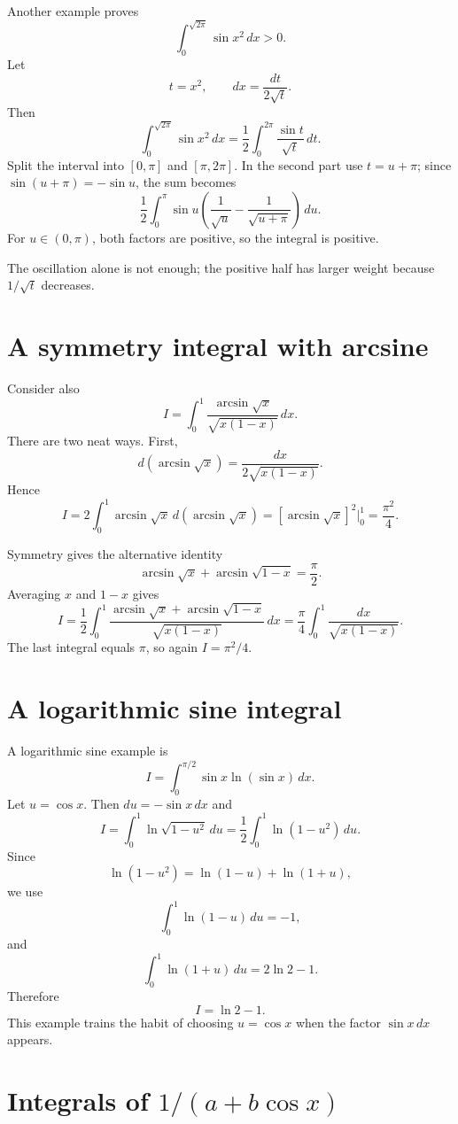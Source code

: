Another example proves
\[
  \int_0^{\sqrt{2\pi}}\sin x^2\,dx>0.
\]
Let
\[
  t=x^2,\qquad dx=
\frac{dt}{2\sqrt t}.
\]
Then
\[
  \int_0^{\sqrt{2\pi}}\sin x^2\,dx
  =
\frac12\int_0^{2\pi}
\frac{\sin t}{\sqrt t}\,dt.
\]
Split the interval into $[0,\pi]$ and $[\pi,2\pi]$.  In the second part use $t=u+\pi$; since $\sin(u+\pi)=-\sin u$, the sum becomes
\[
\frac12\int_0^\pi \sin u
  \left(
\frac1{\sqrt u}-
\frac1{\sqrt{u+\pi}}
\right)\,du.
\]
For $u\in(0,\pi)$, both factors are positive, so the integral is positive.

The oscillation alone is not enough; the positive half has larger weight because $1/\sqrt t$ decreases.

\section{A symmetry integral with arcsine}

Consider also
\[
  I=\int_0^1
\frac{\arcsin\sqrt x}{\sqrt{x(1-x)}}\,dx.
\]
There are two neat ways.  First,
\[
  d(\arcsin\sqrt x)
  =
\frac{dx}{2\sqrt{x(1-x)}}.
\]
Hence
\[
  I=2\int_0^1 \arcsin\sqrt x\,d(\arcsin\sqrt x)
  =
  \left[\arcsin\sqrt x\right]^2\Big|_0^1
  =
\frac{\pi^2}{4}.
\]

Symmetry gives the alternative identity
\[
  \arcsin\sqrt x+\arcsin\sqrt{1-x}=
\frac\pi2.
\]
Averaging $x$ and $1-x$ gives
\[
  I=
\frac12\int_0^1
\frac{\arcsin\sqrt x+\arcsin\sqrt{1-x}}{\sqrt{x(1-x)}}\,dx
  =
\frac\pi4\int_0^1
\frac{dx}{\sqrt{x(1-x)}}.
\]
The last integral equals $\pi$, so again $I=\pi^2/4$.

\section{A logarithmic sine integral}

A logarithmic sine example is
\[
  I=\int_0^{\pi/2}\sin x\ln(\sin x)\,dx.
\]
Let $u=\cos x$.  Then $du=-\sin x\,dx$ and
\[
  I=\int_0^1 \ln\sqrt{1-u^2}\,du
  =
\frac12\int_0^1\ln(1-u^2)\,du.
\]
Since
\[
  \ln(1-u^2)=\ln(1-u)+\ln(1+u),
\]
we use
\[
  \int_0^1\ln(1-u)\,du=-1,
\]
and
\[
  \int_0^1\ln(1+u)\,du=2\ln2-1.
\]
Therefore
\[
  I=\ln2-1.
\]
This example trains the habit of choosing $u=\cos x$ when the factor $\sin x\,dx$ appears.

\section[Integrals of 1/(a + b cos x)]{Integrals of \(1/(a+b\cos x)\)}

